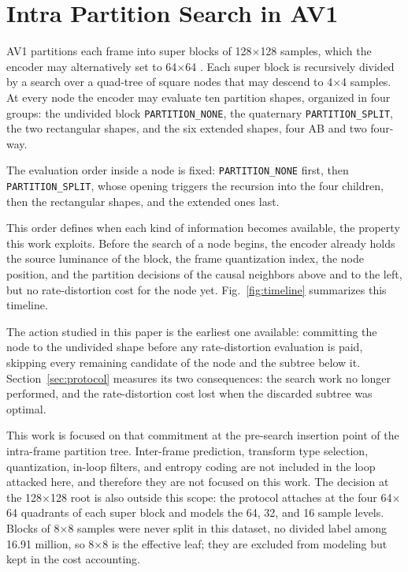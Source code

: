 \documentclass{article}
\begin{document}
\section{Intra Partition Search in AV1}
\label{sec:av1}

AV1 partitions each frame into super blocks of 128$\times$128 samples, which the
encoder may alternatively set to 64$\times$64 \cite{han2021}. Each super block
is recursively divided by a search over a quad-tree of square nodes that may
descend to 4$\times$4 samples. At every node the encoder may evaluate ten
partition shapes, organized in four groups: the undivided block
\texttt{PARTITION\_NONE}, the quaternary \texttt{PARTITION\_SPLIT}, the two
rectangular shapes, and the six extended shapes, four AB and two four-way.

The evaluation order inside a node is fixed: \texttt{PARTITION\_NONE} first, then
\texttt{PARTITION\_SPLIT}, whose opening triggers the recursion into the four
children, then the rectangular shapes, and the extended ones last.

This order defines when each kind of information becomes available, the property
this work exploits. Before the search of a node begins, the encoder already
holds the source luminance of the block, the frame quantization index, the node
position, and the partition decisions of the causal neighbors above and to the
left, but no rate-distortion cost for the node yet. Fig.~\ref{fig:timeline}
summarizes this timeline.

The action studied in this paper is the earliest one available: committing the
node to the undivided shape before any rate-distortion evaluation is paid,
skipping every remaining candidate of the node and the subtree below it.
Section~\ref{sec:protocol} measures its two consequences: the search work no
longer performed, and the rate-distortion cost lost when the discarded subtree
was optimal.

This work is focused on that commitment at the pre-search insertion point of the
intra-frame partition tree. Inter-frame prediction, transform type selection,
quantization, in-loop filters, and entropy coding are not included in the loop
attacked here, and therefore they are not focused on this work. The decision at
the 128$\times$128 root is also outside this scope: the protocol attaches at the
four 64$\times$64 quadrants of each super block and models the 64, 32, and 16
sample levels. Blocks of 8$\times$8 samples were never split in this dataset, no
divided label among 16.91 million, so 8$\times$8 is the effective leaf; they are
excluded from modeling but kept in the cost accounting.
\end{document}
